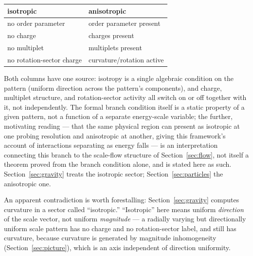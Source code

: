 \documentclass[pdflatex,sn-mathphys-num]{sn-jnl}
\theoremstyle{thmstyleone}
\theoremstyle{thmstylethree}
\theoremstyle{thmstyletwo}
\begin{document}
\begin{center}
\begin{tabular}{ll}
\toprule
isotropic & anisotropic \\
\midrule
no order parameter & order parameter present \\
no charge & charges present \\
no multiplet & multiplets present \\
no rotation-sector charge & curvature/rotation active \\
\bottomrule
\end{tabular}
\end{center}

Both columns have one source: isotropy is a single algebraic condition
on the pattern (uniform direction across the pattern's components), and
charge, multiplet structure, and rotation-sector activity all switch on
or off together with it, not independently. The formal branch condition
itself is a static property of a given pattern, not a function of a
separate energy-scale variable; the further, motivating reading — that
the same physical region can present as isotropic at one probing
resolution and anisotropic at another, giving this framework's account
of interactions separating as energy falls — is an interpretation
connecting this branch to the scale-flow structure of
Section~\ref{sec:flow}, not itself a theorem proved from the branch
condition alone, and is stated here as such. Section~\ref{sec:gravity}
treats the isotropic sector; Section~\ref{sec:particles} the anisotropic
one.

An apparent contradiction is worth forestalling: Section~\ref{sec:gravity}
computes curvature in a sector called ``isotropic.'' ``Isotropic'' here
means uniform \emph{direction} of the scale vector, not uniform
\emph{magnitude} — a radially varying but directionally uniform scale
pattern has no charge and no rotation-sector label, and still has
curvature, because curvature is generated by magnitude inhomogeneity
(Section~\ref{sec:picture}), which is an axis independent of direction
uniformity.
\end{document}
